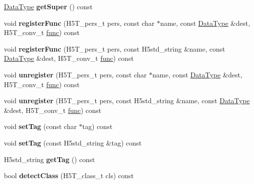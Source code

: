 \begin{DoxyCompactItemize}
\hyperlink{class_h5_1_1_data_type}{Data\+Type} {\bfseries get\+Super} () const
\item 
\mbox{\label{class_h5_1_1_data_type_a00e14e8bcfa3d19d2e26549f775c4c8b}} 
void {\bfseries register\+Func} (H5\+T\+\_\+pers\+\_\+t pers, const char $\ast$name, const \hyperlink{class_h5_1_1_data_type}{Data\+Type} \&dest, H5\+T\+\_\+conv\+\_\+t \hyperlink{structfunc}{func}) const
\item 
\mbox{\label{class_h5_1_1_data_type_a469449d308d016f91111eac0cce74487}} 
void {\bfseries register\+Func} (H5\+T\+\_\+pers\+\_\+t pers, const H5std\+\_\+string \&name, const \hyperlink{class_h5_1_1_data_type}{Data\+Type} \&dest, H5\+T\+\_\+conv\+\_\+t \hyperlink{structfunc}{func}) const
\item 
\mbox{\label{class_h5_1_1_data_type_a53da963264061cbc452a31644d4ffa27}} 
void {\bfseries unregister} (H5\+T\+\_\+pers\+\_\+t pers, const char $\ast$name, const \hyperlink{class_h5_1_1_data_type}{Data\+Type} \&dest, H5\+T\+\_\+conv\+\_\+t \hyperlink{structfunc}{func}) const
\item 
\mbox{\label{class_h5_1_1_data_type_a0ca5c204e1904101fe57d4e68fb4fde1}} 
void {\bfseries unregister} (H5\+T\+\_\+pers\+\_\+t pers, const H5std\+\_\+string \&name, const \hyperlink{class_h5_1_1_data_type}{Data\+Type} \&dest, H5\+T\+\_\+conv\+\_\+t \hyperlink{structfunc}{func}) const
\item 
\mbox{\label{class_h5_1_1_data_type_a6d634099a959fa3266c90489001a85d1}} 
void {\bfseries set\+Tag} (const char $\ast$tag) const
\item 
\mbox{\label{class_h5_1_1_data_type_a51d01795af3280305bf3796556a442d6}} 
void {\bfseries set\+Tag} (const H5std\+\_\+string \&tag) const
\item 
\mbox{\label{class_h5_1_1_data_type_a4625a7f290bd0c011dbf309e3be4a4fe}} 
H5std\+\_\+string {\bfseries get\+Tag} () const
\item 
\mbox{\label{class_h5_1_1_data_type_af45e6051d74d1f77b9a4ede97ed2fcd7}} 
bool {\bfseries detect\+Class} (H5\+T\+\_\+class\+\_\+t cls) const

\end{DoxyCompactItemize}
